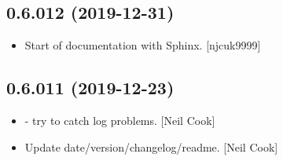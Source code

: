 \documentclass[a4paper,10pt,english]{report}
\begin{document}
\subsection{0.6.012 (2019-12-31)}
\label{\detokenize{misc/changelog:id7}}\begin{itemize}
\item {} 
Start of documentation with Sphinx. {[}njcuk9999{]}

\end{itemize}


\subsection{0.6.011 (2019-12-23)}
\label{\detokenize{misc/changelog:id8}}\begin{itemize}
\item {} 
 - try to catch log problems. {[}Neil Cook{]}

\item {} 
Update date/version/changelog/readme. {[}Neil Cook{]}

\end{itemize}
\end{document}
